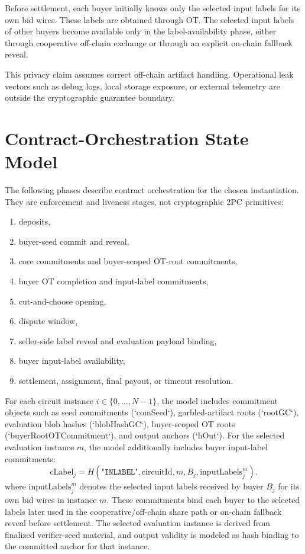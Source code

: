 \documentclass[final,twoside]{vutinfth}
\begin{document}
Before settlement, each buyer initially knows only the selected input labels for
its own bid wires. These labels are obtained through OT. The selected input labels
of other buyers become available only in the label-availability phase, either
through cooperative off-chain exchange or through an explicit on-chain fallback
reveal.

This privacy claim assumes correct off-chain artifact handling. Operational leak
vectors such as debug logs, local storage exposure, or external telemetry are
outside the cryptographic guarantee boundary.

\section{Contract-Orchestration State Model}
The following phases describe contract orchestration for the chosen
instantiation. They are enforcement and liveness stages, not cryptographic 2PC
primitives:
\begin{enumerate}
\item deposits,
\item buyer-seed commit and reveal,
\item core commitments and buyer-scoped OT-root commitments,
\item buyer OT completion and input-label commitments,
\item cut-and-choose opening,
\item dispute window,
\item seller-side label reveal and evaluation payload binding,
\item buyer input-label availability,
\item settlement, assignment, final payout, or timeout resolution.
\end{enumerate}

For each circuit instance $i\in\{0,\dots,N-1\}$, the model includes commitment
objects such as seed commitments (`comSeed`), garbled-artifact roots
(`rootGC`), evaluation blob hashes (`blobHashGC`), buyer-scoped OT roots
(`buyerRootOTCommitment`), and output anchors (`hOut`). For the selected
evaluation instance $m$, the model additionally includes buyer input-label
commitments:
\[
\mathrm{cLabel}_j = H(\texttt{"INLABEL"},\mathrm{circuitId},m,B_j,\mathrm{inputLabels}^m_j).
\]
where $\mathrm{inputLabels}^m_j$ denotes the selected input labels received by
buyer $B_j$ for its own bid wires in instance $m$.
These commitments bind each buyer to the selected labels later used in the
cooperative/off-chain share path or on-chain fallback reveal before settlement.
The selected evaluation instance is derived from finalized verifier-seed
material, and output validity is modeled as hash binding to the committed
anchor for that instance.
\end{document}
